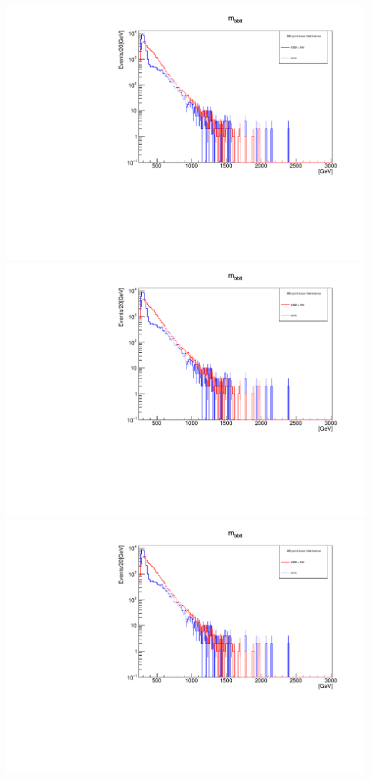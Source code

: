 \documentclass[a4wide,10pt]{article}
\begin{document}
\includegraphics[scale=0.50,page=4]{InterferencePlots20p.pdf}
\includegraphics[scale=0.50,page=5]{InterferencePlots20p.pdf}
\includegraphics[scale=0.50,page=6]{InterferencePlots20p.pdf}
\end{document}
